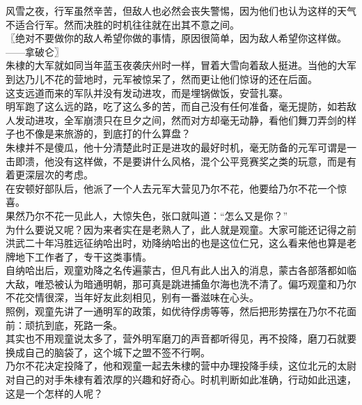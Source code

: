 \begin{multicols}{\theparacolNo}
风雪之夜，行军虽然辛苦，但敌人也必然会丧失警惕，因为他们也认为这样的天气不适合行军。然而决胜的时机往往就在出其不意之间。\\

〖绝对不要做你的敌人希望你做的事情，原因很简单，因为敌人希望你这样做。——拿破仑〗\\

朱棣的大军就如同当年蓝玉夜袭庆州时一样，冒着大雪向着敌人挺进。当他的大军到达乃儿不花的营地时，元军被惊呆了，然而更让他们惊讶的还在后面。\\

这支远道而来的军队并没有发动进攻，而是埋锅做饭，安营扎寨。\\

明军跑了这么远的路，吃了这么多的苦，而自己没有任何准备，毫无提防，如若敌人发动进攻，全军崩溃只在旦夕之间，然而对方却毫无动静，看他们舞刀弄剑的样子也不像是来旅游的，到底打的什么算盘？\\

朱棣并不是傻瓜，他十分清楚此时正是进攻的最好时机，毫无防备的元军可谓是一击即溃，他没有这样做，不是要讲什么风格，混个公平竞赛奖之类的玩意，而是有着更深层次的考虑。\\

在安顿好部队后，他派了一个人去元军大营见乃尔不花，他要给乃尔不花一个惊喜。\\

果然乃尔不花一见此人，大惊失色，张口就叫道：“怎么又是你？”\\

为什么要说又呢？因为来者实在是老熟人了，此人就是观童。大家可能还记得之前洪武二十年冯胜远征纳哈出时，劝降纳哈出的也是这位仁兄，这么看来他也算是老牌地下工作者了，专干这类事情。\\

自纳哈出后，观童劝降之名传遍蒙古，但凡有此人出入的消息，蒙古各部落都如临大敌，唯恐被认为暗通明朝，那可真是跳进捕鱼尔海也洗不清了。偏巧观童和乃尔不花交情很深，当年好友此刻相见，别有一番滋味在心头。\\

照例，观童先讲了一通明军的政策，如优待俘虏等等，然后把形势摆在乃尔不花面前：顽抗到底，死路一条。\\

其实也不用观童说太多了，营外明军磨刀的声音都听得见，再不投降，磨刀石就要换成自己的脑袋了，这个城下之盟不签不行啊。\\

乃尔不花决定投降了，他和观童一起去朱棣的营中办理投降手续，这位北元的太尉对自己的对手朱棣有着浓厚的兴趣和好奇心。时机判断如此准确，行动如此迅速，这是一个怎样的人呢？\\


\end{multicols}
